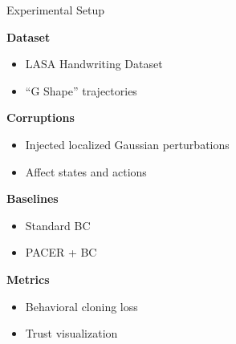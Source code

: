 \begin{frame}{Experimental Setup}

    \textbf{Dataset}
    \begin{itemize}
        \item LASA Handwriting Dataset
        \item ``G Shape'' trajectories
    \end{itemize}

    \vspace{0.5em}

    \textbf{Corruptions}
    \begin{itemize}
        \item Injected localized Gaussian perturbations
        \item Affect states and actions
    \end{itemize}

    \vspace{0.5em}

    \textbf{Baselines}
    \begin{itemize}
        \item Standard BC
        \item PACER + BC
    \end{itemize}

    \vspace{0.5em}

    \textbf{Metrics}
    \begin{itemize}
        \item Behavioral cloning loss
        \item Trust visualization
    \end{itemize}

\end{frame}
